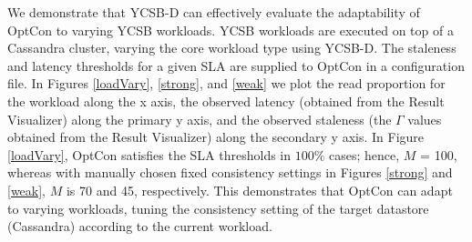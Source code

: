 \documentclass[conference]{IEEEtran}
\begin{document}
  We demonstrate that YCSB-D can effectively evaluate the adaptability of OptCon to varying YCSB workloads. %
   YCSB workloads are executed on top of a Cassandra cluster, varying the core workload type using YCSB-D.
   The staleness and latency thresholds for a given SLA are supplied to OptCon in a configuration file.  In Figures \ref{loadVary}, \ref{strong},  and \ref{weak}
 we plot the read proportion for the workload along the x axis, the observed latency (obtained from the Result Visualizer) along the primary y axis, and the observed staleness (the {\boldmath$\Gamma$} values obtained from the Result Visualizer) along the secondary y axis.
 In Figure \ref{loadVary}, OptCon satisfies the SLA thresholds in $100\%$ cases; hence, $M$ = 100, whereas with manually chosen fixed consistency settings in Figures \ref{strong}  and \ref{weak}, $M$ is 70 and 45, respectively.
 This demonstrates that OptCon can adapt to varying workloads, tuning the consistency setting of the target datastore (Cassandra) according to the current workload.
\end{document}

